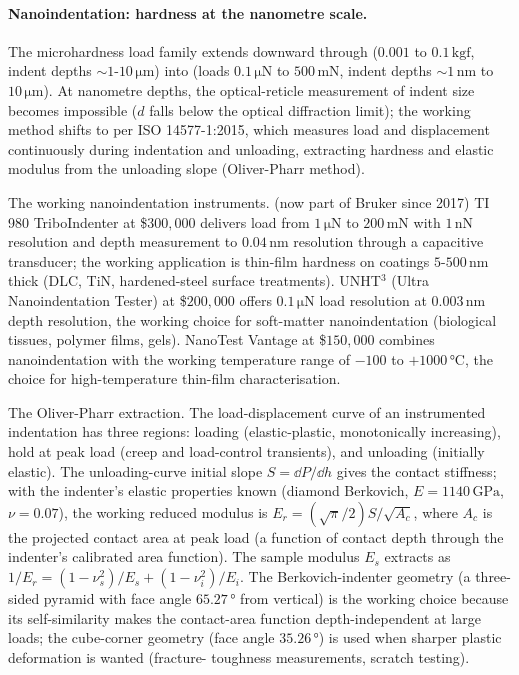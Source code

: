 \paragraph{Nanoindentation: hardness at the nanometre scale.}
The microhardness load family extends downward through
 ($0.001$ to $0.1\,\text{kgf}$,
indent depths $\sim 1$-$10\,\si{\micro\meter}$) into
 (loads $0.1\,\si{\micro\newton}$ to
$500\,\si{\milli\newton}$, indent depths $\sim 1\,\si{\nano\meter}$
to $10\,\si{\micro\meter}$). At nanometre depths, the
optical-reticle measurement of indent size becomes impossible
($d$ falls below the optical diffraction limit); the working
method shifts to  per ISO
14577-1:2015, which measures load and displacement continuously
during indentation and unloading, extracting hardness and
elastic modulus from the unloading slope (Oliver-Pharr method).

The working nanoindentation instruments.  (now
part of Bruker since 2017) TI 980 TriboIndenter at \$$300{,}000$
delivers load from $1\,\si{\micro\newton}$ to $200\,\si{\milli
\newton}$ with $1\,\si{\nano\newton}$ resolution and depth
measurement to $0.04\,\si{\nano\meter}$ resolution through a
capacitive transducer; the working application is thin-film
hardness on coatings $5$-$500\,\si{\nano\meter}$ thick (DLC, TiN,
hardened-steel surface treatments).  UNHT$^3$
(Ultra Nanoindentation Tester) at \$$200{,}000$ offers
$0.1\,\si{\micro\newton}$ load resolution at $0.003\,\si{\nano
\meter}$ depth resolution, the working choice for soft-matter
nanoindentation (biological tissues, polymer films, gels).
 NanoTest Vantage at \$$150{,}000$
combines nanoindentation with the working temperature range of
$-100$ to $+1000\,\si{\degreeCelsius}$, the choice for
high-temperature thin-film characterisation.

The Oliver-Pharr extraction. The load-displacement curve of an
instrumented indentation has three regions: loading
(elastic-plastic, monotonically increasing), hold at peak load
(creep and load-control transients), and unloading (initially
elastic). The unloading-curve initial slope $S = \dd P/\dd h$
gives the contact stiffness; with the indenter's elastic
properties known (diamond Berkovich, $E = 1140\,\si{\giga\pascal}$,
$\nu = 0.07$), the working reduced modulus is
$E_{r} = (\sqrt{\pi}/2) S/\sqrt{A_{c}}$, where $A_{c}$ is the
projected contact area at peak load (a function of contact depth
through the indenter's calibrated area function). The sample
modulus $E_{s}$ extracts as $1/E_{r} = (1 - \nu_{s}^{2})/E_{s} +
(1 - \nu_{i}^{2})/E_{i}$. The Berkovich-indenter geometry (a
three-sided pyramid with face angle $65.27\,\si{\degree}$ from
vertical) is the working choice because its self-similarity
makes the contact-area function depth-independent at large
loads; the cube-corner geometry (face angle $35.26\,\si{\degree}$)
is used when sharper plastic deformation is wanted (fracture-
toughness measurements, scratch testing).

